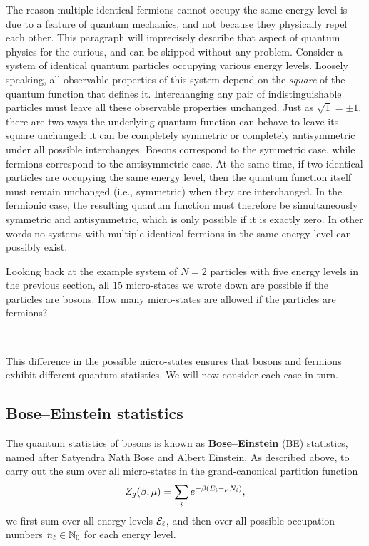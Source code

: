 The reason multiple identical fermions cannot occupy the same energy level is due to a feature of quantum mechanics, and not because they physically repel each other.
This paragraph will imprecisely describe that aspect of quantum physics for the curious, and can be skipped without any problem.
Consider a system of identical quantum particles occupying various energy levels.
Loosely speaking, all observable properties of this system depend on the \emph{square} of the quantum function that defines it.
Interchanging any pair of indistinguishable particles must leave all these observable properties unchanged.
Just as $\sqrt{1} = \pm 1$, there are two ways the underlying quantum function can behave to leave its square unchanged: it can be completely symmetric or completely antisymmetric under all possible interchanges.
Bosons correspond to the symmetric case, while fermions correspond to the antisymmetric case.
At the same time, if two identical particles are occupying the same energy level, then the quantum function itself must remain unchanged (i.e., symmetric) when they are interchanged.
In the fermionic case, the resulting quantum function must therefore be simultaneously symmetric and antisymmetric, which is only possible if it is exactly zero.
In other words no systems with multiple identical fermions in the same energy level can possibly exist.

Looking back at the example system of $N = 2$ particles with five energy levels in the previous section, all $15$ micro-states we wrote down are possible if the particles are bosons.
How many micro-states are allowed if the particles are fermions?
\begin{mdframed}
  \ \\[24 pt]
\end{mdframed}
This difference in the possible micro-states ensures that bosons and fermions exhibit different quantum statistics.
We will now consider each case in turn.



\subsection{\label{sec:bose}Bose--Einstein statistics}
The quantum statistics of bosons is known as \textbf{Bose--Einstein} (BE) statistics, named after Satyendra Nath Bose and Albert Einstein.
As described above, to carry out the sum over all micro-states in the grand-canonical partition function
\begin{equation*}
  Z_g(\beta, \mu) = \sum_i e^{-\beta (E_i - \mu N_i)},
\end{equation*}
we first sum over all energy levels $\mathcal E_{\ell}$, and then over all possible occupation numbers $n_{\ell} \in \mathbb N_0$ for each energy level.

